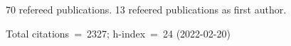 70 refereed publications. 13 refeered publications as first author.

Total citations~=~2327; h-index~=~24 (2022-02-20)